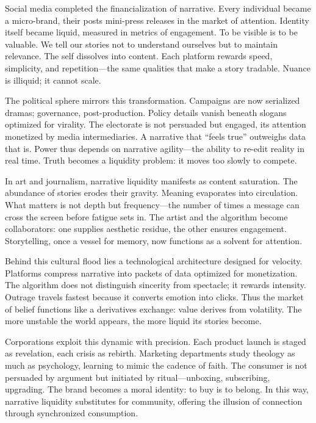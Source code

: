 \documentclass[11pt,twoside]{book}
\begin{document}
Social media completed the financialization of narrative.  Every individual became a micro-brand, their posts mini-press releases in the market of attention.  Identity itself became liquid, measured in metrics of engagement.  To be visible is to be valuable.  We tell our stories not to understand ourselves but to maintain relevance.  The self dissolves into content.  Each platform rewards speed, simplicity, and repetition—the same qualities that make a story tradable.  Nuance is illiquid; it cannot scale.

The political sphere mirrors this transformation.  Campaigns are now serialized dramas; governance, post-production.  Policy details vanish beneath slogans optimized for virality.  The electorate is not persuaded but engaged, its attention monetized by media intermediaries.  A narrative that “feels true” outweighs data that is.  Power thus depends on narrative agility—the ability to re-edit reality in real time.  Truth becomes a liquidity problem: it moves too slowly to compete.

In art and journalism, narrative liquidity manifests as content saturation.  The abundance of stories erodes their gravity.  Meaning evaporates into circulation.  What matters is not depth but frequency—the number of times a message can cross the screen before fatigue sets in.  The artist and the algorithm become collaborators: one supplies aesthetic residue, the other ensures engagement.  Storytelling, once a vessel for memory, now functions as a solvent for attention.

Behind this cultural flood lies a technological architecture designed for velocity.  Platforms compress narrative into packets of data optimized for monetization.  The algorithm does not distinguish sincerity from spectacle; it rewards intensity.  Outrage travels fastest because it converts emotion into clicks.  Thus the market of belief functions like a derivatives exchange: value derives from volatility.  The more unstable the world appears, the more liquid its stories become.

Corporations exploit this dynamic with precision.  Each product launch is staged as revelation, each crisis as rebirth.  Marketing departments study theology as much as psychology, learning to mimic the cadence of faith.  The consumer is not persuaded by argument but initiated by ritual—unboxing, subscribing, upgrading.  The brand becomes a moral identity: to buy is to belong.  In this way, narrative liquidity substitutes for community, offering the illusion of connection through synchronized consumption.
\end{document}
